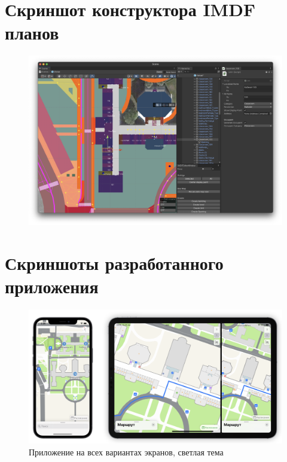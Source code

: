   \newpage
\chapter{Скриншот конструктора IMDF планов}
  \label{appendix:editor}
  \begin{figure}[H]
    \includegraphics[width=1\textwidth]{assets/appendix/editor.jpg}
  \end{figure}


  \newpage
\chapter{Скриншоты разработанного приложения}
  \label{appendix:ios-result}
  \begin{figure}[H]
    \includegraphics[width=1\textwidth]{assets/appendix/ios-result/white.png}
    \caption*{Приложение на всех вариантах экранов, светлая тема}
  \end{figure}

